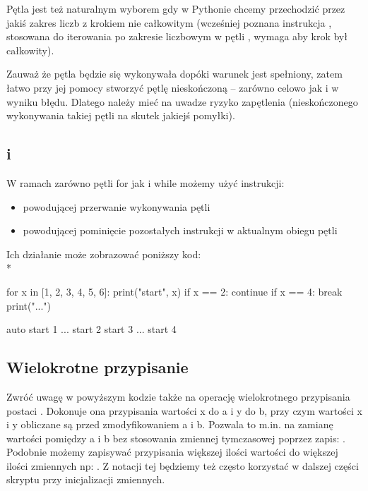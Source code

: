 Pętla  jest też naturalnym wyborem gdy w Pythonie chcemy przechodzić przez jakiś zakres liczb z krokiem nie całkowitym
	(wcześniej poznana instrukcja , stosowana do iterowania po zakresie liczbowym w pętli , wymaga aby krok był całkowity).

Zauważ że pętla będzie się wykonywała dopóki warunek jest spełniony, zatem łatwo przy jej pomocy stworzyć pętlę nieskończoną – zarówno celowo jak i w wyniku błędu.
Dlatego należy mieć na uwadze ryzyko zapętlenia (nieskończonego wykonywania takiej pętli na skutek jakiejś pomyłki).


\subsection{ i }

W ramach zarówno pętli for jak i while możemy użyć instrukcji:
\begin{itemize}
	\item {} powodującej przerwanie wykonywania pętli
	\item {} powodującej pominięcie pozostałych instrukcji w aktualnym obiegu pętli
\end{itemize}

Ich działanie może zobrazować poniższy kod:
\\*
\begin{CodeFrame}[python]{0.50\textwidth}
for x in [1, 2, 3, 4, 5, 6]:
  print("start", x)
  if x == 2:
    continue
  if x == 4:
    break
  print("...")
\end{CodeFrame}
\begin{CodeFrame}{auto}
start 1
...
start 2
start 3
...
start 4
\end{CodeFrame}


\subsection{Wielokrotne przypisanie}

Zwróć uwagę w powyższym kodzie także na operację wielokrotnego przypisania postaci .
Dokonuje ona przypisania wartości x do a i y do b, przy czym wartości x i y obliczane są przed zmodyfikowaniem a i b.
Pozwala to m.in. na zamianę wartości pomiędzy a i b bez stosowania zmiennej tymczasowej poprzez zapis: .
Podobnie możemy zapisywać przypisania większej ilości wartości do większej ilości zmiennych np: .
Z notacji tej będziemy też często korzystać w dalszej części skryptu przy inicjalizacji zmiennych.
